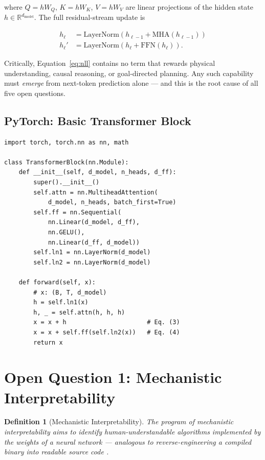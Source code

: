 \documentclass[10pt,twocolumn]{article}
\newtheorem{definition}{Definition}
\begin{document}
\noindent where $Q = h W_Q$, $K = h W_K$, $V = h W_V$ are linear projections
of the hidden state $h \in \mathbb{R}^{d_{\text{model}}}$.  The full
residual-stream update is

\begin{align}
  h_\ell &= \text{LayerNorm}(h_{\ell-1} + \text{MHA}(h_{\ell-1})) \label{eq:res1}\\
  h_\ell'&= \text{LayerNorm}(h_\ell + \text{FFN}(h_\ell)).\label{eq:res2}
\end{align}

\noindent Critically, Equation~\ref{eq:nll} contains no term that rewards
physical understanding, causal reasoning, or goal-directed planning.
Any such capability must \emph{emerge} from next-token prediction alone —
and this is the root cause of all five open questions.

\subsection{PyTorch: Basic Transformer Block}

\begin{lstlisting}[caption={Single transformer layer in PyTorch.}]
import torch, torch.nn as nn, math

class TransformerBlock(nn.Module):
    def __init__(self, d_model, n_heads, d_ff):
        super().__init__()
        self.attn = nn.MultiheadAttention(
            d_model, n_heads, batch_first=True)
        self.ff = nn.Sequential(
            nn.Linear(d_model, d_ff),
            nn.GELU(),
            nn.Linear(d_ff, d_model))
        self.ln1 = nn.LayerNorm(d_model)
        self.ln2 = nn.LayerNorm(d_model)

    def forward(self, x):
        # x: (B, T, d_model)
        h = self.ln1(x)
        h, _ = self.attn(h, h, h)
        x = x + h                      # Eq. (3)
        x = x + self.ff(self.ln2(x))   # Eq. (4)
        return x
\end{lstlisting}

\section{Open Question 1: Mechanistic Interpretability}
\label{sec:interpretability}

\begin{definition}[Mechanistic Interpretability]
The program of \emph{mechanistic interpretability} aims to identify
human-understandable algorithms implemented by the weights of a neural
network — analogous to reverse-engineering a compiled binary into
readable source code \citep{olah2020zoom}.
\end{definition}
\end{document}
